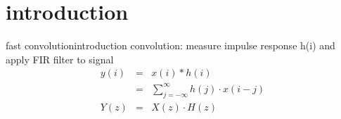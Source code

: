 



\subtitle{Part 9: Fast Convolution}


	

\section[intro]{introduction}
	\begin{frame}{fast convolution}{introduction}
		convolution: measure impulse response h(i) and apply FIR filter to signal
		\begin{eqnarray*}
			y(i) &=& x(i) \ast h(i)\\
				 &=& \sum\limits_{j=-\infty}^{\infty}{h(j)\cdot x(i-j)}\\
			Y(z) &=& X(z) \cdot H(z)
		\end{eqnarray*}
	\end{frame}

